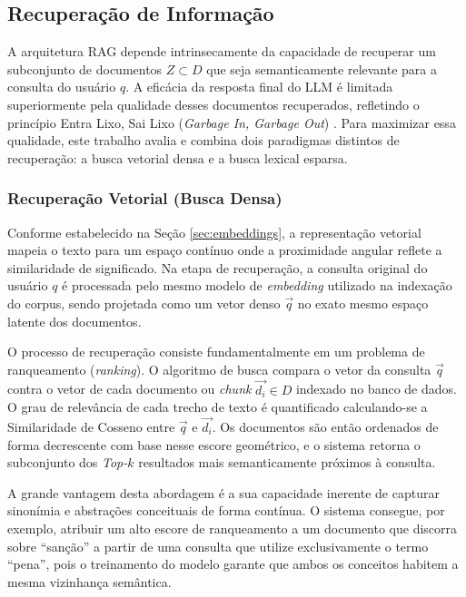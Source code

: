 \subsection{Recuperação de Informação}

A arquitetura RAG depende intrinsecamente da capacidade de recuperar um subconjunto de documentos $Z \subset D$ que seja semanticamente relevante para a consulta do usuário $q$. A eficácia da resposta final do LLM é limitada superiormente pela qualidade desses documentos recuperados, refletindo o princípio Entra Lixo, Sai Lixo (\textit{Garbage In, Garbage Out}) \citep{zhao2025thinkingcrowdauxiliaryinformation}. Para maximizar essa qualidade, este trabalho avalia e combina dois paradigmas distintos de recuperação: a busca vetorial densa e a busca lexical esparsa.

\subsubsection{Recuperação Vetorial (Busca Densa)}

Conforme estabelecido na Seção \ref{sec:embeddings}, a representação vetorial mapeia o texto para um espaço contínuo onde a proximidade angular reflete a similaridade de significado. Na etapa de recuperação, a consulta original do usuário $q$ é processada pelo mesmo modelo de \textit{embedding} utilizado na indexação do corpus, sendo projetada como um vetor denso $\vec{q}$ no exato mesmo espaço latente dos documentos.

O processo de recuperação consiste fundamentalmente em um problema de ranqueamento (\textit{ranking}). O algoritmo de busca compara o vetor da consulta $\vec{q}$ contra o vetor de cada documento ou \textit{chunk} $\vec{d_i} \in D$ indexado no banco de dados. O grau de relevância de cada trecho de texto é quantificado calculando-se a Similaridade de Cosseno entre $\vec{q}$ e $\vec{d_i}$.  Os documentos são então ordenados de forma decrescente com base nesse escore geométrico, e o sistema retorna o subconjunto dos \textit{Top-}$k$ resultados mais semanticamente próximos à consulta.

A grande vantagem desta abordagem é a sua capacidade inerente de capturar sinonímia e abstrações conceituais de forma contínua. O sistema consegue, por exemplo, atribuir um alto escore de ranqueamento a um documento que discorra sobre ``sanção'' a partir de uma consulta que utilize exclusivamente o termo ``pena'', pois o treinamento do modelo garante que ambos os conceitos habitem a mesma vizinhança semântica.

